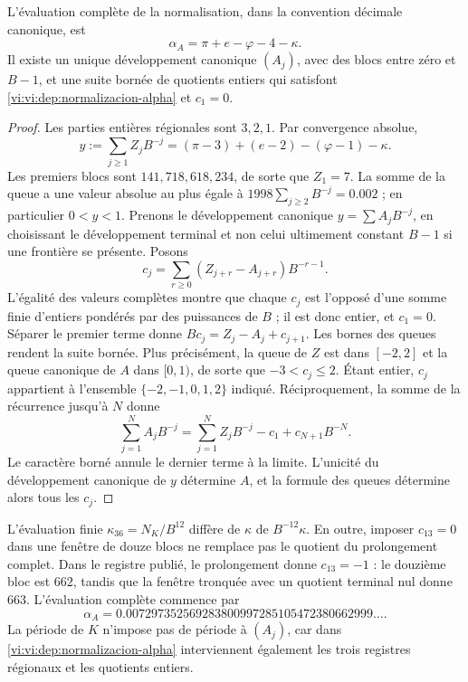 \begin{theorem}
\label{vi:vi:dep:alpha-completa}
L’évaluation complète de la normalisation, dans la convention décimale
canonique, est
\begin{equation}
 \alpha_A=\pi+e-\varphi-4-\kappa.
 \label{vi:vi:dep:alpha-A}
\end{equation}
Il existe un unique développement canonique \((A_j)\), avec des blocs entre zéro
et \(B-1\), et une suite bornée de quotients entiers qui satisfont
\eqref{vi:vi:dep:normalizacion-alpha} et \(c_1=0\).
\end{theorem}
\begin{proof}
Les parties entières régionales sont \(3,2,1\). Par convergence absolue,
\[
 y:=\sum_{j\ge1}Z_jB^{-j}
   =(\pi-3)+(e-2)-(\varphi-1)-\kappa.
\]
Les premiers blocs sont \(141,718,618,234\), de sorte que
\(Z_1=7\). La somme de la queue a une valeur absolue au plus
égale à \(1998\sum_{j\ge2}B^{-j}=0.002\) ; en particulier \(0<y<1\).
Prenons le développement canonique \(y=\sum A_jB^{-j}\), en choisissant le
développement terminal et non celui ultimement constant \(B-1\) si une
frontière se présente. Posons
\[
 c_j=\sum_{r\ge0}(Z_{j+r}-A_{j+r})B^{-r-1}.
\]
L’égalité des valeurs complètes montre que chaque \(c_j\) est
l’opposé d’une somme finie d’entiers pondérés par des puissances de
\(B\) ; il est donc entier, et \(c_1=0\). Séparer le premier terme
donne \(Bc_j=Z_j-A_j+c_{j+1}\). Les bornes des queues rendent la
suite bornée. Plus précisément, la queue de \(Z\) est dans \([-2,2]\)
et la queue canonique de \(A\) dans \([0,1)\), de sorte que
\(-3<c_j\le2\). Étant entier, \(c_j\) appartient à l’ensemble
\(\{-2,-1,0,1,2\}\) indiqué.
Réciproquement, la somme de la récurrence jusqu’à \(N\) donne
\[
 \sum_{j=1}^N A_jB^{-j}
 =\sum_{j=1}^N Z_jB^{-j}-c_1+c_{N+1}B^{-N}.
\]
Le caractère borné annule le dernier terme à la limite. L’unicité du
développement canonique de \(y\) détermine \(A\), et la formule des queues
détermine alors tous les \(c_j\).
\end{proof}

L'évaluation finie \(\kappa_{36}=N_K/B^{12}\) diffère de
\(\kappa\) de \(B^{-12}\kappa\). En outre, imposer
\(c_{13}=0\) dans une fenêtre de douze blocs ne remplace pas le quotient
du prolongement complet. Dans le registre publié, le prolongement
donne \(c_{13}=-1\) : le douzième bloc est \(662\), tandis que la
fenêtre tronquée avec un quotient terminal nul donne \(663\). L'évaluation
complète commence par
\[
 \alpha_A=0.007297352569283800997285105472380662999\ldots.
\]
La période de \(K\) n’impose pas de période à \((A_j)\), car dans
\eqref{vi:vi:dep:normalizacion-alpha} interviennent également les trois
registres régionaux et les quotients entiers.

